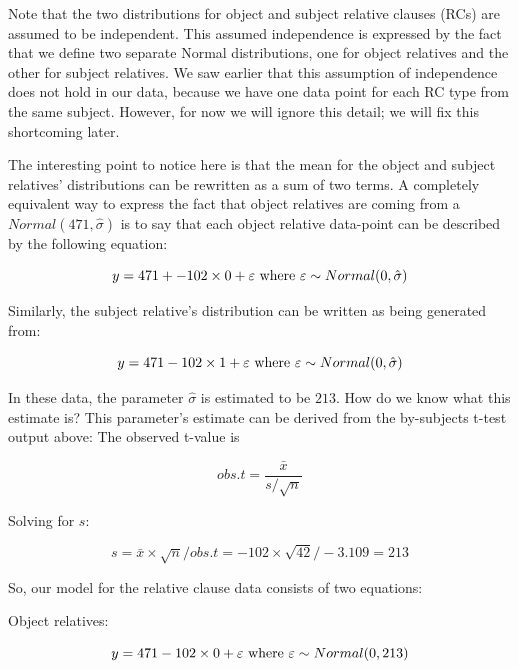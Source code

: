 \documentclass[12pt,]{krantz}
\begin{document}
Note that the two distributions for object and subject relative clauses (RCs) are assumed to be independent. This assumed independence is expressed by the fact that we define two separate Normal distributions, one for object relatives and the other for subject relatives. We saw earlier that this assumption of independence does not hold in our data, because we have one data point for each RC type from the same subject. However, for now we will ignore this detail; we will fix this shortcoming later.

The interesting point to notice here is that the mean for the object and subject relatives' distributions can be rewritten as a sum of two terms. A completely equivalent way to express the fact that object relatives are coming from a \(Normal(471,\hat\sigma)\) is to say that each object relative data-point can be described by the following equation:

\begin{equation}
y = 471 + -102 \times 0 + \varepsilon \hfill \hbox{ where } \varepsilon \sim Normal(0,\hat\sigma)
\end{equation}

Similarly, the subject relative's distribution can be written as being generated from:

\begin{equation}
y = 471 - 102 \times 1 + \varepsilon \hbox{ where } \varepsilon \sim Normal(0,\hat\sigma)
\end{equation}

In these data, the parameter \(\hat\sigma\) is estimated to be \(213\). How do we know what this estimate is? This parameter's estimate can be derived from the by-subjects t-test output above: The observed t-value is

\begin{equation}
obs.t= \frac{\bar{x}}{s/\sqrt{n}} 
\end{equation}

Solving for \(s\):

\begin{equation}
 s = \bar{x} \times \sqrt{n}/obs.t = -102 \times \sqrt{42}/-3.109  =  213
\end{equation}

So, our model for the relative clause data consists of two equations:

Object relatives:

\begin{equation}
y = 471 -102\times 0 + \varepsilon \hfill \hbox{ where } \varepsilon \sim Normal(0,213)
\end{equation}
\end{document}
